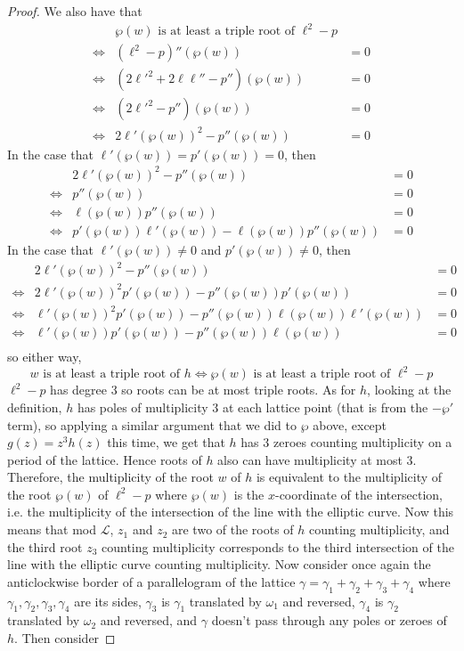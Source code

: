 \documentclass{article}
\theoremstyle{definition}
\theoremstyle{definition}
\theoremstyle{definition}
\begin{document}
\begin{proof}
We also have that
\begin{align*}
    &\text{$\wp(w)$ is at least a triple root of $\ell^2-p$}\\
    \iff &(\ell^2-p)''(\wp(w))&=0\\
    \iff &(2{\ell'}^2+2\ell\ell''-p'')(\wp(w))&=0\\
    \iff &(2{\ell'}^2-p'')(\wp(w))&=0\\
    \iff&2\ell'(\wp(w))^2-p''(\wp(w))&=0
\end{align*}
In the case that $\ell'(\wp(w))=p'(\wp(w))=0$, then 
\begin{align*}
&2\ell'(\wp(w))^2-p''(\wp(w))&=0\\
\iff&p''(\wp(w))&=0\\
\iff&\ell(\wp(w))p''(\wp(w))&=0\\
\iff&p'(\wp(w))\ell'(\wp(w))-\ell(\wp(w))p''(\wp(w))&=0
\end{align*}
In the case that $\ell'(\wp(w))\neq0$ and $p'(\wp(w))\neq0$, then
\begin{align*}
&2\ell'(\wp(w))^2-p''(\wp(w))&=0\\
\iff&2\ell'(\wp(w))^2p'(\wp(w))-p''(\wp(w))p'(\wp(w))&=0\\
\iff&\ell'(\wp(w))^2p'(\wp(w))-p''(\wp(w))\ell(\wp(w))\ell'(\wp(w))&=0\\
\iff&\ell'(\wp(w))p'(\wp(w))-p''(\wp(w))\ell(\wp(w))&=0\\
\end{align*}
so either way, 
$$w\text{ is at least a triple root of }h \iff \wp(w)\text{ is at least a triple root of }\ell^2-p$$
$\ell^2-p$ has degree $3$ so roots can be at most triple roots. As for $h$, looking at the definition, $h$ has poles of multiplicity $3$ at each lattice point (that is from the $-\wp'$ term), so applying a similar argument that we did to $\wp$ above, except $g(z)=z^3h(z)$ this time, we get that $h$ has $3$ zeroes counting multiplicity on a period of the lattice. Hence roots of $h$ also can have multiplicity at most $3$. Therefore,  the multiplicity of the root $w$ of $h$ is equivalent to the multiplicity of the root $\wp(w)$ of $\ell^2-p$ where $\wp(w)$ is the $x$-coordinate of the intersection, i.e. the multiplicity of the intersection of the line with the elliptic curve.
\newline\newline
Now this means that mod $\mathcal L$, $z_1$ and $z_2$ are two of the roots of $h$ counting multiplicity, and the third root $z_3$ counting multiplicity corresponds to the third intersection of the line with the elliptic curve counting multiplicity. Now consider once again the anticlockwise border of a parallelogram of the lattice $\gamma=\gamma_1+\gamma_2+\gamma_3+\gamma_4$ where $\gamma_1,\gamma_2,\gamma_3,\gamma_4$ are its sides, $\gamma_3$ is $\gamma_1$ translated by $\omega_1$ and reversed, $\gamma_4$ is $\gamma_2$ translated by $\omega_2$ and reversed, and $\gamma$ doesn't pass through any poles or zeroes of $h$. Then consider

\end{proof}
\end{document}
